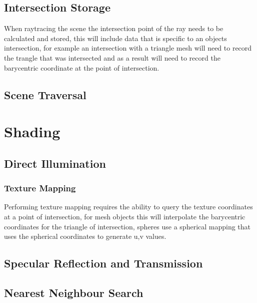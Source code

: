 \subsection{Intersection Storage}
When raytracing the scene the intersection point of the ray needs to be calculated and stored, this will include data that
is specific to an objects intersection, for example an intersection with a triangle mesh will need to record the trangle
that was intersected and as a result will need to record the barycentric coordinate at the point of intersection.

\subsection{Scene Traversal}

\section{Shading}

\subsection{Direct Illumination}
\subsubsection{Texture Mapping}
Performing texture mapping requires the ability to query the texture coordinates at a point of intersection, for mesh objects this
will interpolate the barycentric coordinates for the triangle of intersection, spheres use a spherical mapping that uses the
spherical coordinates to generate u,v values.

\subsection{Specular Reflection and Transmission}

\subsection{Nearest Neighbour Search}

